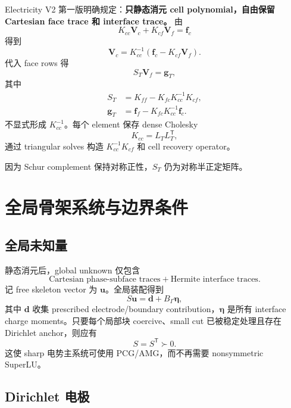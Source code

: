 \documentclass[UTF8,a4paper,11pt]{ctexart}
\newcommand{\vct}[1]{\bm{#1}}
\newcommand{\T}{\mathsf{T}}
\begin{document}
Electricity V2 第一版明确规定：\textbf{只静态消元 cell polynomial，自由保留 Cartesian face trace 和 interface trace。} 由
\[
K_{cc}\vct V_c+K_{cf}\vct V_f=\vct f_c
\]
得到
\begin{equation}
\boxed{
\vct V_c=K_{cc}^{-1}\left(\vct f_c-K_{cf}\vct V_f\right).
}
\label{eq:cell_recovery}
\end{equation}
代入 face rows 得
\begin{equation}
\boxed{
S_T\vct V_f=\vct g_T,
}
\label{eq:local_schur}
\end{equation}
其中
\begin{align}
\boxed{S_T}&=K_{ff}-K_{fc}K_{cc}^{-1}K_{cf},\label{eq:local_condensed_matrix}\\
\boxed{\vct g_T}&=\vct f_f-K_{fc}K_{cc}^{-1}\vct f_c.\label{eq:local_condensed_rhs}
\end{align}
不显式形成 \(K_{cc}^{-1}\)。每个 element 保存 dense Cholesky
\[
K_{cc}=L_TL_T^{\T},
\]
通过 triangular solves 构造 \(K_{cc}^{-1}K_{cf}\) 和 cell recovery operator。

因为 Schur complement 保持对称正性，\(S_T\) 仍为对称半正定矩阵。

\section{全局骨架系统与边界条件}

\subsection{全局未知量}

静态消元后，global unknown 仅包含
\[
\boxed{
\text{Cartesian phase-subface traces}
+\text{Hermite interface traces}.
}
\]
记 free skeleton vector 为 \(\vct u\)。全局装配得到
\begin{equation}
\boxed{
S\vct u=\vct d+B_\Gamma\vct\eta,
}
\label{eq:global_skeleton}
\end{equation}
其中 \(\vct d\) 收集 prescribed electrode/boundary contribution，\(\vct\eta\) 是所有 interface charge moments。只要每个局部块 coercive、small cut 已被稳定处理且存在 Dirichlet anchor，则应有
\begin{equation}
\boxed{S=S^{\T}\succ0.}
\label{eq:SPD}
\end{equation}
这使 sharp 电势主系统可使用 PCG/AMG，而不再需要 nonsymmetric SuperLU。

\subsection{Dirichlet 电极}
\end{document}
